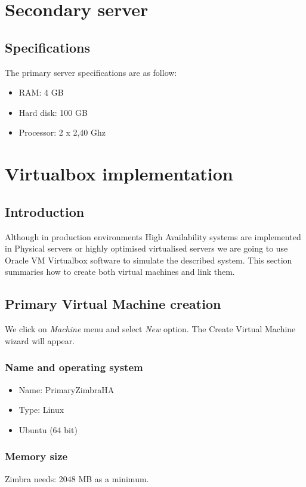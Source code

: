 \section {Secondary server}
\subsection {Specifications}
The primary server specifications are as follow:
\begin{itemize}
  \item RAM: 4 GB
  \item Hard disk: 100 GB
  \item Processor: 2 x 2,40 Ghz
\end{itemize}

\section {Virtualbox implementation}
\subsection {Introduction}
Although in production environments High Availability systems are implemented in Physical servers or highly optimised virtualised servers we are going to use Oracle VM Virtualbox software to simulate the described system. This section summaries how to create both virtual machines and link them.

\subsection {\label{subsec:primary-virtual-machine-creation}Primary Virtual Machine creation}
We click on \textit{Machine} menu and select \textit{New} option. The Create Virtual Machine wizard will appear.

\subsubsection {Name and operating system}
\begin{itemize}
  \item Name: PrimaryZimbraHA
  \item Type: Linux
  \item Ubuntu (64 bit)
\end{itemize}

\subsubsection {Memory size}
Zimbra needs: 2048 MB as a minimum.
